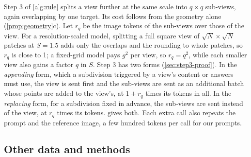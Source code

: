 Step 3 of \cref{alg:rule} splits a view further at the same scale into $q \times q$ sub-views, again overlapping by one target. Its cost follows from the geometry alone (\cref{prop:geometry}c). Let $r_q$ be the image tokens of the sub-views over those of the view. For a resolution-scaled model, splitting a full square view of $\sqrt N \times \sqrt N$ patches at $S = 1.5$ adds only the overlaps and the rounding to whole patches, so $r_q$ is close to 1; a fixed-grid model pays $g^2$ per view, so $r_q = q^2$, while each smaller view also gains a factor $q$ in $S$. Step 3 has two forms (\cref{sec:step3-proof}). In the \emph{appending} form, which a subdivision triggered by a view's content or answers must use, the view is sent first and the sub-views are sent as an additional batch whose points are added to the view's, at $1 + r_q$ times its tokens in all. In the \emph{replacing} form, for a subdivision fixed in advance, the sub-views are sent instead of the view, at $r_q$ times its tokens.  gives both. Each extra call also repeats the prompt and the reference image, a few hundred tokens per call for our prompts.

\begin{table}[t]
\centering
\small
\setlength{\tabcolsep}{3pt}
\caption{Image tokens of step 3, splitting one full view into $q \times q$ sub-views at the same $S = 1.5$ with one target of overlap. $r_q$: the batch of sub-views over the parent view (replacing form); $1 + r_q$: the view and its sub-views together (appending form). Prompts and reference images excluded.}
\label{tab:step3}
\end{table}

\subsection{Other data and methods}
\label{sec:rule-more}

